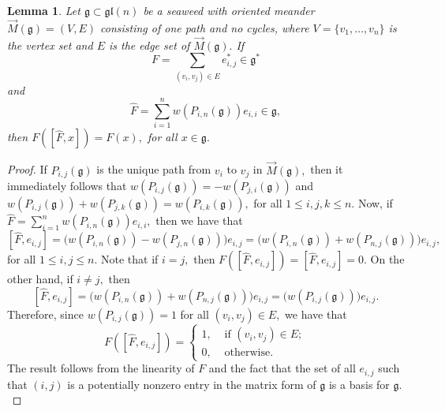 \documentclass[letterpaper,10pt]{article}
\newtheorem{lemma}[theorem]{Lemma}
\begin{document}
\begin{lemma}\label{lem:specmeander}
Let $\mathfrak{g}\subset\mathfrak{gl}(n)$ be a seaweed with oriented meander $\overrightarrow{M}(\mathfrak{g})=(V,E)$ consisting of one path and no cycles, where $V=\{v_1,\dots,v_n\}$ is the vertex set and $E$ is the edge set of $\overrightarrow{M}(\mathfrak{g}).$ If $$F=\sum_{(v_i,v_j)\in E}e_{i,j}^*\in\mathfrak{g}^*$$ and $$\widehat{F}=\sum_{i=1}^n w(P_{i,n}(\mathfrak{g}))e_{i,i}\in\mathfrak{g},$$ then $F\left(\left[\widehat{F},x\right]\right)=F(x),$ for all $x\in\mathfrak{g}.$
\end{lemma}
\begin{proof}
If $P_{i,j}(\mathfrak{g})$ is the unique path from $v_i$ to $v_j$ in $\overrightarrow{M}(\mathfrak{g}),$ then it immediately follows that $w(P_{i,j}(\mathfrak{g}))=-w(P_{j,i}(\mathfrak{g}))$ and $w(P_{i,j}(\mathfrak{g}))+w(P_{j,k}(\mathfrak{g}))=w(P_{i,k}(\mathfrak{g})),$ for all $1\leq i,j,k\leq n.$ Now, if $\widehat{F}=\sum_{i=1}^nw(P_{i,n}(\mathfrak{g}))e_{i,i},$ then we have that $$\left[\widehat{F},e_{i,j}\right]=\big(w(P_{i,n}(\mathfrak{g}))-w(P_{j,n}(\mathfrak{g}))\big)e_{i,j}=\big(w(P_{i,n}(\mathfrak{g}))+w(P_{n,j}(\mathfrak{g}))\big)e_{i,j},$$ for all $1\leq i,j\leq n$. Note that if $i=j,$ then $F\left(\left[\widehat{F},e_{i,j}\right]\right)=\left[\widehat{F},e_{i,j}\right]=0.$ On the other hand, if $i\neq j,$ then $$\left[\widehat{F},e_{i,j}\right]=\big(w(P_{i,n}(\mathfrak{g}))+w(P_{n,j}(\mathfrak{g}))\big)e_{i,j}=\big(w(P_{i,j}(\mathfrak{g}))\big)e_{i,j}.$$ Therefore, since $w(P_{i,j}(\mathfrak{g}))=1$ for all $(v_i,v_j)\in E,$ we have that $$F\left(\left[\widehat{F},e_{i,j}\right]\right)=\begin{cases}
1, & \text{ if } (v_i,v_j)\in E;\\
0, & \text{ otherwise}.
\end{cases}$$ The result follows from the linearity of $F$ and the fact that the set of all $e_{i,j}$ such that $(i,j)$ is a potentially nonzero entry in the matrix form of $\mathfrak{g}$ is a basis for $\mathfrak{g}.$ 
\end{proof}
\end{document}
